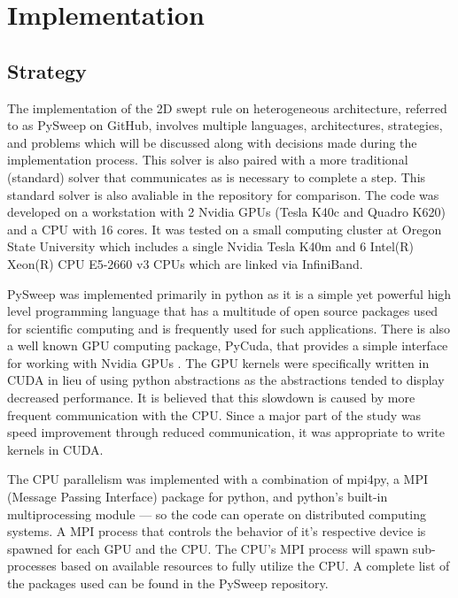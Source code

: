 \documentclass[review]{elsarticle}
\begin{document}
%
%

\section{Implementation}
\subsection{Strategy}
The implementation of the 2D swept rule on heterogeneous architecture, referred to as PySweep on GitHub, involves multiple languages, architectures, strategies, and problems which will be discussed along with decisions made during the implementation process. This solver is also paired with a more traditional (standard) solver that communicates as is necessary to complete a step. This standard solver is also avaliable in the repository for comparison. The code was developed on a workstation with 2 Nvidia GPUs (Tesla K40c and Quadro K620) and a CPU with 16 cores. It was tested on a small computing cluster at Oregon State University which includes a single Nvidia Tesla K40m and 6 Intel(R) Xeon(R) CPU E5-2660 v3 CPUs which are linked via InfiniBand.

\par
PySweep was implemented primarily in python as it is a simple yet powerful high level programming language that has a multitude of open source packages used for scientific computing and is frequently used for such applications. There is also a well known GPU computing package, PyCuda, that provides a simple interface for working with Nvidia GPUs \cite{KlocknerPyCUDAGeneration}. The GPU kernels were specifically written in CUDA in lieu of using python abstractions as the abstractions tended to display decreased performance. It is believed that this slowdown is caused by more frequent communication with the CPU. Since a major part of the study was speed improvement through reduced communication, it was appropriate to write kernels in CUDA. 

\par
The CPU parallelism was implemented with a combination of mpi4py, a MPI (Message Passing Interface) package for python, and python's built-in multiprocessing module --- so the code can operate on distributed computing systems. A MPI process that controls the behavior of it's respective device is spawned for each GPU and the CPU. The CPU's MPI process will spawn sub-processes based on available resources to fully utilize the CPU. A complete list of the packages used can be found in the PySweep repository.
\end{document}

